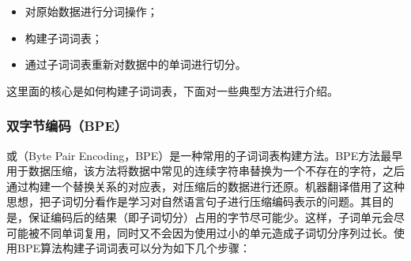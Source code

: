 \begin{itemize}
\vspace{0.5em}
\item 对原始数据进行分词操作；
\vspace{0.5em}
\item 构建子词词表；
\vspace{0.5em}
\item 通过子词词表重新对数据中的单词进行切分。
\vspace{0.5em}
\end{itemize}

\parinterval 这里面的核心是如何构建子词词表，下面对一些典型方法进行介绍。


\subsubsection{双字节编码（BPE）}

或{\small{}}（Byte Pair Encoding，BPE）是一种常用的子词词表构建方法\cite{DBLP:conf/acl/SennrichHB16a}。BPE方法最早用于数据压缩，该方法将数据中常见的连续字符串替换为一个不存在的字符，之后通过构建一个替换关系的对应表，对压缩后的数据进行还原。机器翻译借用了这种思想，把子词切分看作是学习对自然语言句子进行压缩编码表示的问题\cite{philipAlgorithmfordataCompression}。其目的是，保证编码后的结果（即子词切分）占用的字节尽可能少。这样，子词单元会尽可能被不同单词复用，同时又不会因为使用过小的单元造成子词切分序列过长。使用BPE算法构建子词词表可以分为如下几个步骤：

